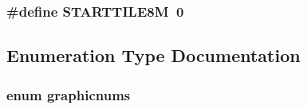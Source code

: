 \label{GFXE__SOD_8H_a63a36c8955b74ee16ba0fc61f4d62478}
\hypertarget{GFXE__SOD_8H_a56df7bfae7e081f1fe22c67f356c0f12}{
\subsubsection[{STARTTILE8M}]{\setlength{\rightskip}{0pt plus 5cm}\#define STARTTILE8M~0}}
\label{GFXE__SOD_8H_a56df7bfae7e081f1fe22c67f356c0f12}


\subsection{Enumeration Type Documentation}
\hypertarget{GFXE__SOD_8H_a82d35df9a0074a553383c0776300fa10}{
\subsubsection[{graphicnums}]{\setlength{\rightskip}{0pt plus 5cm}enum {\bf graphicnums}}}
\label{GFXE__SOD_8H_a82d35df9a0074a553383c0776300fa10}
